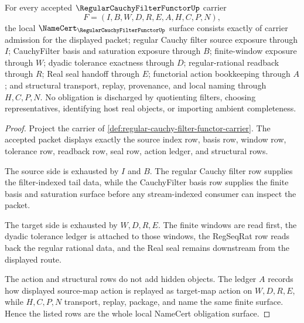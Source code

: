 \begin{theorem}
\label{thm:regular-cauchy-filter-functor-namecert-obligations}
For every accepted $\RegularCauchyFilterFunctorUp$ carrier
$$
F=(I,B,W,D,R,E,A,H,C,P,N),
$$
the local $\NameCert_{\RegularCauchyFilterFunctorUp}$ surface consists exactly of carrier admission for the displayed packet; regular Cauchy filter source exposure through $I$; CauchyFilter basis and saturation exposure through $B$; finite-window exposure through $W$; dyadic tolerance exactness through $D$; regular-rational readback through $R$; Real seal handoff through $E$; functorial action bookkeeping through $A$; and structural transport, replay, provenance, and local naming through $H,C,P,N$. No obligation is discharged by quotienting filters, choosing representatives, identifying host real objects, or importing ambient completeness.
\end{theorem}
\begin{proof}
Project the carrier of \autoref{def:regular-cauchy-filter-functor-carrier}. The accepted packet displays exactly the source index row, basis row, window row, tolerance row, readback row, seal row, action ledger, and structural rows.

The source side is exhausted by $I$ and $B$. The regular Cauchy filter row supplies the filter-indexed tail data, while the CauchyFilter basis row supplies the finite basis and saturation surface before any stream-indexed consumer can inspect the packet.

The target side is exhausted by $W,D,R,E$. The finite windows are read first, the dyadic tolerance ledger is attached to those windows, the RegSeqRat row reads back the regular rational data, and the Real seal remains downstream from the displayed route.

The action and structural rows do not add hidden objects. The ledger $A$ records how displayed source-map action is replayed as target-map action on $W,D,R,E$, while $H,C,P,N$ transport, replay, package, and name the same finite surface. Hence the listed rows are the whole local NameCert obligation surface.
\end{proof}

